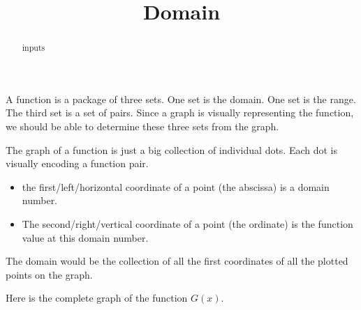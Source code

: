 \documentclass{ximera}
\title{Domain}
\begin{document}
\begin{abstract}
inputs
\end{abstract}
\maketitle


A function is a package of three sets.  One set is the domain. One set is the range. The third set is a set of pairs. Since a graph is visually representing the function, we should be able to determine these three sets from the graph.


The graph of a function is just a big collection of individual dots. Each dot is visually encoding a function pair. 



\begin{itemize}
     \item the first/left/horizontal coordinate of a point (the abscissa) is a domain number.
     \item The second/right/vertical coordinate of a point (the ordinate) is the function value at this domain number.
\end{itemize}



The domain would be the collection of all the first coordinates of all the plotted points on the graph. 






Here is the complete graph of the function $G(x)$. 
\end{document}
